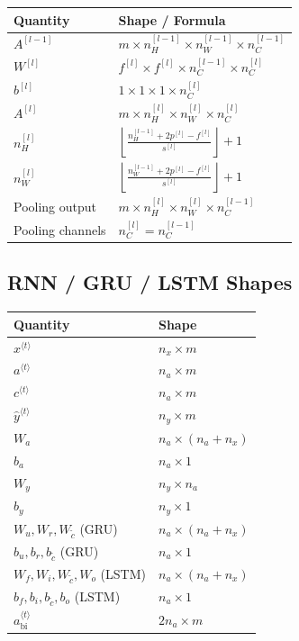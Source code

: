 \begin{center}
\begin{tabular}{ll}
\toprule
Quantity & Shape / Formula \\
\midrule
$A^{[l-1]}$ & $m \times n_H^{[l-1]} \times n_W^{[l-1]} \times n_C^{[l-1]}$ \\
$W^{[l]}$ & $f^{[l]} \times f^{[l]} \times n_C^{[l-1]} \times n_C^{[l]}$ \\
$b^{[l]}$ & $1 \times 1 \times 1 \times n_C^{[l]}$ \\
$A^{[l]}$ & $m \times n_H^{[l]} \times n_W^{[l]} \times n_C^{[l]}$ \\
$n_H^{[l]}$ & $\left\lfloor\frac{n_H^{[l-1]}+2p^{[l]}-f^{[l]}}{s^{[l]}}\right\rfloor+1$ \\
$n_W^{[l]}$ & $\left\lfloor\frac{n_W^{[l-1]}+2p^{[l]}-f^{[l]}}{s^{[l]}}\right\rfloor+1$ \\
Pooling output & $m \times n_H^{[l]} \times n_W^{[l]} \times n_C^{[l-1]}$ \\
Pooling channels & $n_C^{[l]}=n_C^{[l-1]}$ \\
\bottomrule
\end{tabular}
\end{center}

\subsection{RNN / GRU / LSTM Shapes}

\begin{center}
\begin{tabular}{ll}
\toprule
Quantity & Shape \\
\midrule
$x^{\langle t\rangle}$ & $n_x \times m$ \\
$a^{\langle t\rangle}$ & $n_a \times m$ \\
$c^{\langle t\rangle}$ & $n_a \times m$ \\
$\hat{y}^{\langle t\rangle}$ & $n_y \times m$ \\
$W_a$ & $n_a \times (n_a+n_x)$ \\
$b_a$ & $n_a \times 1$ \\
$W_y$ & $n_y \times n_a$ \\
$b_y$ & $n_y \times 1$ \\
$W_u,W_r,W_{\tilde{c}}$ (GRU) & $n_a \times (n_a+n_x)$ \\
$b_u,b_r,b_{\tilde{c}}$ (GRU) & $n_a \times 1$ \\
$W_f,W_i,W_{\tilde{c}},W_o$ (LSTM) & $n_a \times (n_a+n_x)$ \\
$b_f,b_i,b_{\tilde{c}},b_o$ (LSTM) & $n_a \times 1$ \\
$a_{\mathrm{bi}}^{\langle t\rangle}$ & $2n_a \times m$ \\
\bottomrule
\end{tabular}
\end{center}

